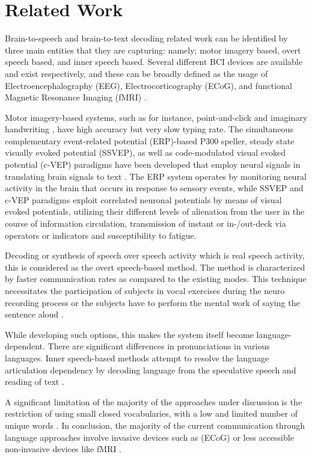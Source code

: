 \section{Related Work}
Brain-to-speech and brain-to-text decoding related work can be identified by three main entities that they are capturing: namely; motor imagery based, overt speech based, and inner speech based. Several different BCI devices are available and exist respectively, and these can be broadly defined as the usage of Electroencephalography (EEG), Electrocorticography (ECoG), and functional Magnetic Resonance Imaging (fMRI) \cite{Panachakel2021}.

Motor imagery-based systems, such as for instance, point-and-click \cite{Jarosiewicz2015} and imaginary handwriting \cite{Willett2021}, have high accuracy but very slow typing rate. The simultaneous complementary event-related potential (ERP)-based P300 speller, steady state visually evoked potential (SSVEP), as well as code-modulated visual evoked potential (c-VEP) paradigms have been developed that employ neural signals in translating brain signals to text \cite{Lee2018}. The ERP system operates by monitoring neural activity in the brain that occurs in response to sensory events, while SSVEP and c-VEP paradigms exploit correlated neuronal potentials by means of visual evoked potentials, utilizing their different levels of alienation from the user in the course of information circulation, transmission of instant or in-/out-deck via operators or indicators and susceptibility to fatigue.

Decoding or synthesis of speech over speech activity which is real speech activity, this is considered as the overt speech-based method. The method is characterized by faster communication rates \cite{Makin2020} as compared to the existing modes. This technique necessitates the participation of subjects in vocal exercises during the neuro recording process \cite{Anumanchipalli2019} or the subjects have to perform the mental work of saying the sentence aloud \cite{Brigham2010}.

While developing such options, this makes the system itself become language-dependent. There are significant differences in pronunciations in various languages. Inner speech-based methods attempt to resolve the language articulation dependency by decoding language from the speculative speech and reading of text \cite{Defossez2023, Nieto2022}.

A significant limitation of the majority of the approaches under discussion is the restriction of using small closed vocabularies, with a low and limited number of unique words \cite{Brigham2010, Pandarinath2017}. In conclusion, the majority of the current communication through language approaches involve invasive devices such as (ECoG) \cite{Willett2021} or less accessible non-invasive devices like fMRI \cite{Nieto2022}.

